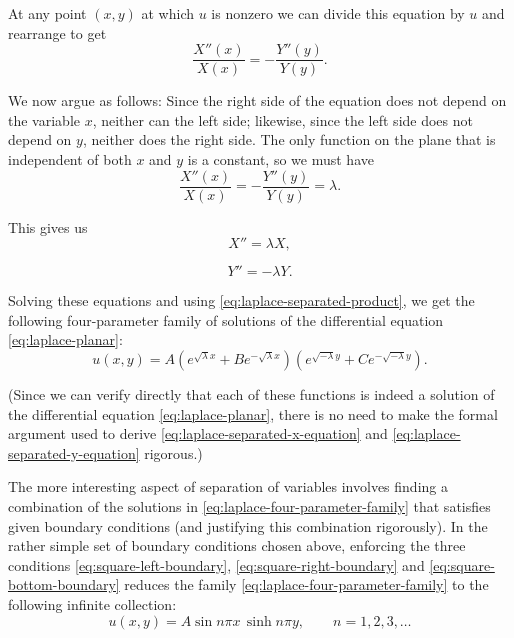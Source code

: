 At any point $(x,y)$ at which $u$ is nonzero we can divide this equation by $u$ and rearrange to get
\begin{equation}\label{eq:laplace-separated-ratios}
\dfrac{X''(x)}{X(x)}=-\dfrac{Y''(y)}{Y(y)}.
\end{equation}


We now argue as follows: Since the right side of the equation does not depend on the variable $x$, neither can the left side; likewise, since the left side does not depend on $y$, neither does the right side. The only function on the plane that is independent of both $x$ and $y$ is a constant, so we must have
\begin{equation}\label{eq:laplace-separation-constant}
\dfrac{X''(x)}{X(x)}=-\dfrac{Y''(y)}{Y(y)}=\lambda.
\end{equation}


This gives us
\begin{equation}\label{eq:laplace-separated-x-equation}
X''=\lambda X,
\end{equation}

\begin{equation}\label{eq:laplace-separated-y-equation}
Y''=-\lambda Y.
\end{equation}


Solving these equations and using \eqref{eq:laplace-separated-product}, we get the following four-parameter family of solutions of the differential equation \eqref{eq:laplace-planar}:
\begin{equation}\label{eq:laplace-four-parameter-family}
u(x,y)=A\left(e^{\sqrt{\lambda}x}+Be^{-\sqrt{\lambda}x}\right)\left(e^{\sqrt{-\lambda}y}+Ce^{-\sqrt{-\lambda}y}\right).
\end{equation}


(Since we can verify directly that each of these functions is indeed a solution of the differential equation \eqref{eq:laplace-planar}, there is no need to make the formal argument used to derive \eqref{eq:laplace-separated-x-equation} and \eqref{eq:laplace-separated-y-equation} rigorous.)

The more interesting aspect of separation of variables involves finding a combination of the solutions in \eqref{eq:laplace-four-parameter-family} that satisfies given boundary conditions (and justifying this combination rigorously). In the rather simple set of boundary conditions chosen above, enforcing the three conditions \eqref{eq:square-left-boundary}, \eqref{eq:square-right-boundary} and \eqref{eq:square-bottom-boundary} reduces the family \eqref{eq:laplace-four-parameter-family} to the following infinite collection:
\begin{equation}\label{eq:square-three-boundary-modes}
u(x,y)=A\sin n\pi x\,\sinh n\pi y,\qquad n=1,2,3,\ldots
\end{equation}


